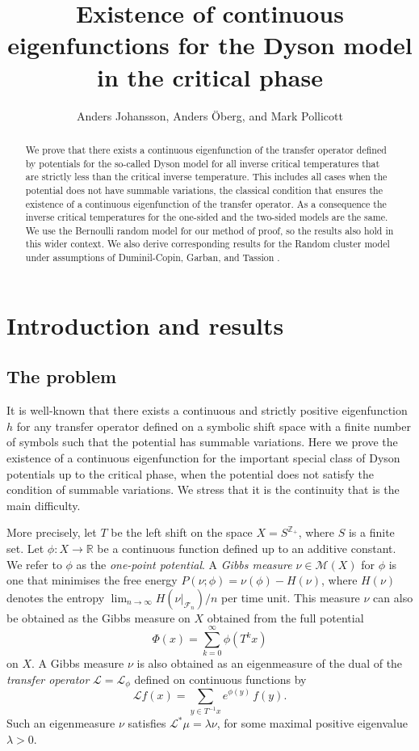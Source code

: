 \documentclass[11pt, a4paper]{amsart}
\title[Existence of continuous eigenfunction]{Existence of continuous
  eigenfunctions for the Dyson model in the critical phase}
\author{Anders Johansson, Anders \"Oberg, and Mark Pollicott}
\date{}
\theoremstyle{definition}
\theoremstyle{remark}
\providecommand{\RR}{\mathbb{R}}
\providecommand{\CF}{\mathscr{F}}
\providecommand{\CM}{\mathscr{M}}
\providecommand{\mc}{\mathcal}
\def\X{X}
\def\T{T}
\begin{document}
\maketitle
\begin{abstract}
  We prove that there exists a continuous eigenfunction of the transfer operator
  defined by potentials for the so-called Dyson model for all inverse critical
  temperatures that are strictly less than the critical inverse temperature.
  This includes all cases when the potential does not have summable variations,
  the classical condition that ensures the existence of a continuous
  eigenfunction of the transfer operator. As a consequence the inverse critical
  temperatures for the one-sided and the two-sided models are the same. We use
  the Bernoulli random model for our method of proof, so the results also hold in
  this wider context. We also derive corresponding results for the Random cluster model
  under assumptions of Duminil-Copin, Garban, and Tassion \cite{duminil}.
\end{abstract}
\def\h{h}


\section{Introduction and results}\noindent

\subsection{The problem}
It is well-known \cite{walters1} that there exists a continuous and strictly
positive eigenfunction $h$ for any transfer operator defined on a symbolic shift
space with a finite number of symbols such that the potential has summable
variations. Here we prove the existence of a continuous eigenfunction for the
important special class of Dyson potentials up to the critical phase, when the
potential does not satisfy the condition of summable variations. We stress that
it is the continuity that is the main difficulty. 

More precisely, let $\T$ be the left shift on the space $\X=S^{{\mathbb Z}_+}$,
where $S$ is a finite set. Let $\phi:\X\to \RR$ be a continuous function defined up
to an additive constant. We refer to $\phi$ as the \emph{one-point potential}. A
\emph{Gibbs measure} $\nu\in\CM(\X)$ for $\phi$ is one that minimises the free energy
$P(\nu;\phi)=\nu(\phi)-H(\nu)$, where $H(\nu)$ denotes the entropy
$\lim_{n\to\infty} H(\nu\vert_{\CF_n})/n$ per time unit. This measure $\nu$ can also be
obtained as the Gibbs measure on $\X$ obtained from the full potential
$$ \Phi(x)=\sum_{k=0}^\infty \phi(\T^k x) $$
on $\X$. A Gibbs measure $\nu$ is also obtained as an eigenmeasure of the dual of
the \emph{transfer operator} $\mc L=\mc L_\phi$ defined on continuous functions by
\begin{equation}\label{trans}
  \mc{L} f(x)= \sum_{y\in T^{-1}x} e^{\phi(y)}\, f(y).
\end{equation}
Such an eigenmeasure $\nu$ satisfies $\mc{L}^* \mu=\lambda \nu$, for some maximal positive
eigenvalue $\lambda>0$.
\end{document}
